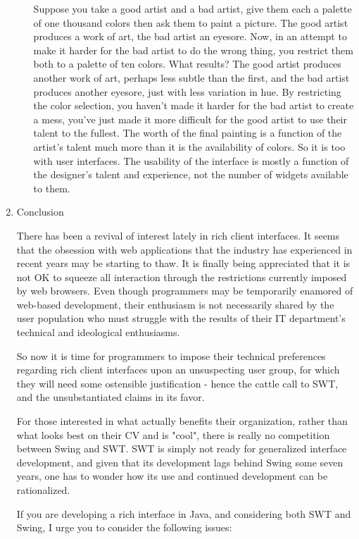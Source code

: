 \documentclass{article}
\begin{document}
\begin{enumerate}
\begin{enumerate}
Suppose you take a good artist and a bad artist, give them each a
palette of one thousand colors then ask them to paint a picture. The
good artist produces a work of art, the bad artist an eyesore. Now, in
an attempt to make it harder for the bad artist to do the wrong thing,
you restrict them both to a palette of ten colors. What results? The
good artist produces another work of art, perhaps less subtle than the
first, and the bad artist produces another eyesore, just with less
variation in hue. By restricting the color selection, you haven't made
it harder for the bad artist to create a mess, you've just made it more
difficult for the good artist to use their talent to the fullest. The
worth of the final painting is a function of the artist's talent much
more than it is the availability of colors. So it is too with user
interfaces. The usability of the interface is mostly a function of the
designer's talent and experience, not the number of widgets available to
them.
\end{enumerate}

\item Conclusion
\label{sec:orgheadline299}

There has been a revival of interest lately in rich client interfaces.
It seems that the obsession with web applications that the industry has
experienced in recent years may be starting to thaw. It is finally being
appreciated that it is not OK to squeeze all interaction through the
restrictions currently imposed by web browsers. Even though programmers
may be temporarily enamored of web-based development, their enthusiasm
is not necessarily shared by the user population who must struggle with
the results of their IT department's technical and ideological
enthusiasms.

So now it is time for programmers to impose their technical preferences
regarding rich client interfaces upon an unsuspecting user group, for
which they will need some ostensible justification - hence the cattle
call to SWT, and the unsubstantiated claims in its favor.

For those interested in what actually benefits their organization,
rather than what looks best on their CV and is "cool", there is really
no competition between Swing and SWT. SWT is simply not ready for
generalized interface development, and given that its development lags
behind Swing some seven years, one has to wonder how its use and
continued development can be rationalized.

If you are developing a rich interface in Java, and considering both SWT
and Swing, I urge you to consider the following issues:


\end{enumerate}
\end{document}

